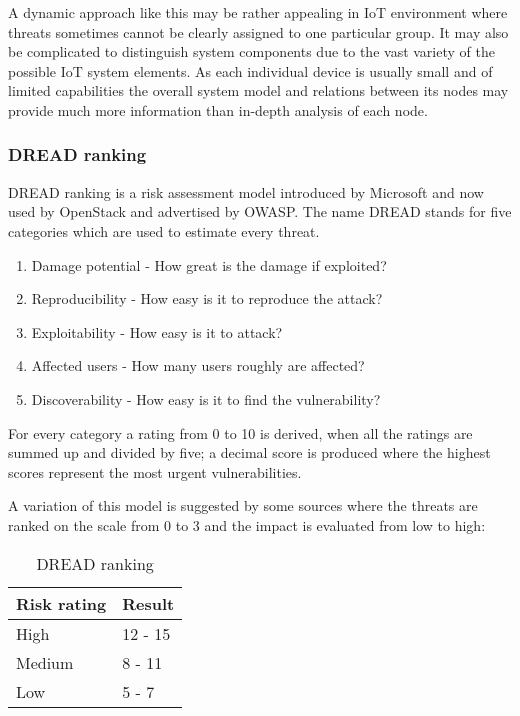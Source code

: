 A dynamic approach like this may be rather appealing in IoT environment where threats sometimes cannot be clearly assigned to one particular group. It may also be complicated to distinguish system components due to the vast variety of the possible IoT system elements. As each individual device is usually small and of limited capabilities the overall system model and relations between its nodes may provide much more information than in-depth analysis of each node.

\subsubsection{DREAD ranking}
DREAD ranking is a risk assessment model introduced by Microsoft and now used by OpenStack and advertised by OWASP\cite{dread-openstack}\cite{dread-owasp}. The name DREAD stands for five categories which are used to estimate every threat.
\begin{enumerate}
	\item Damage potential - How great is the damage if exploited?
	\item Reproducibility - How easy is it to reproduce the attack?
	\item Exploitability - How easy is it to attack?
	\item Affected users - How many users roughly are affected?
	\item Discoverability - How easy is it to find the vulnerability? \cite{cookbook}
\end{enumerate}
For every category a rating from 0 to 10 is derived, when all the ratings are summed up and divided by five; a decimal score is produced where the highest scores represent the most urgent vulnerabilities. 

A variation of this model is suggested by some sources\cite{dread}\cite{cookbook} where the threats are ranked on the scale from 0 to 3 and the impact is evaluated from low to high:

\def\riska{High}
\def \probabilitya {12 - 15}

\def\riskaa{Medium}
\def \probabilityaa {8 - 11}

\def\riskaaa{Low}
\def \probabilityaaa {5 - 7}

\begin{table}
	\centering
	\begin{tabular}{ |m{2cm}|m{2cm}| } 
		\hline
		Risk rating & Result\\ 
		\hline
		\riska & \probabilitya \\ 
		\hline
		\riskaa & \probabilityaa \\ 
		\hline
		\riskaaa & \probabilityaaa \\ 
		\hline
	\end{tabular}
	\caption{\label{tab:dread_ranking} DREAD ranking}
\end{table}


